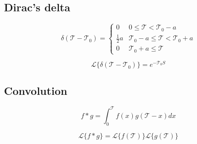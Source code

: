 \documentclass[letterpaper]{article}
\newcommand{\divline}{\noindent\makebox[\linewidth]{\rule{\textwidth}{0.4pt}}}
\begin{document}
    \divline

    \begin{multicols}{2}
        \section{Dirac's delta}

            \[\delta (\mathcal{T} - \mathcal{T}_{0}) = 
                \begin{cases} 
				0  & 0 \leq \mathcal{T} < \mathcal{T}_{0} - a \\
                    \frac{1}{2}a & \mathcal{T}_{0} - a \leq \mathcal{T} < \mathcal{T}_{0} + a \\
				0 & \mathcal{T}_{0} + a \leq \mathcal{T}
			\end{cases}
            \]

            \[\mathcal{L} \{ \delta(\mathcal{T} - \mathcal{T}_{0}) \} = e^{-\mathcal{T}_{0} S} \]
    \end{multicols}

    \divline

    \begin{multicols}{2}
        \section{Convolution}

            \[f * g = \int^{\mathcal{T}}_0 f(x) g(\mathcal{T} - x) dx \]

            \[\mathcal{L} \{ f * g \} = \mathcal{L} \{ f(\mathcal{T}) \} \mathcal{L} \{ g(\mathcal{T}) \} \]
    \end{multicols}

    \divline
\end{document}
